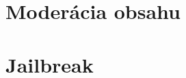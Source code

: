 


\section*{Moderácia obsahu \label{sec:content_moderation_resume}}



\section*{Jailbreak \label{sec:jailbreak_resume}}












